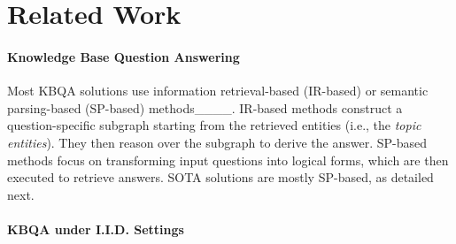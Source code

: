 \section{Related Work}
\label{sec:literature}

\paragraph{Knowledge Base Question Answering}

Most KBQA 
solutions use {information retrieval-based} (IR-based) or {semantic parsing-based} (SP-based) methods____. IR-based methods construct a question-specific subgraph starting from the retrieved entities (i.e., the \emph{topic entities}). They then reason over  the  subgraph to derive the answer. SP-based methods focus on transforming input questions into logical forms, which are then executed to retrieve answers. %
SOTA solutions are mostly SP-based, as detailed next.





\paragraph{KBQA under I.I.D. Settings}

